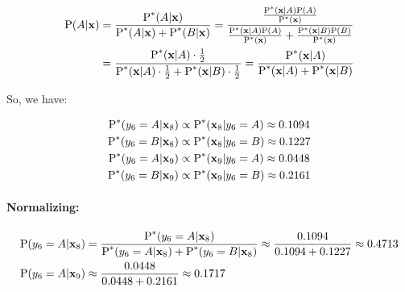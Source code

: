 \documentclass[12pt]{article}
\begin{document}
\begin{enumerate}[leftmargin=\labelsep]
\begin{enumerate}
            \begin{equation}
            \begin{split}
                \textrm{P}(A|\mathbf{x}) &= \frac{\textrm{P}^*(A|\mathbf{x})}{\textrm{P}^*(A|\mathbf{x}) + \textrm{P}^*(B|\mathbf{x})} = \frac{\frac{\textrm{P}^*(\mathbf{x}|A)\textrm{P}(A)}{\textrm{P}^*(\mathbf{x})}}{\frac{\textrm{P}^*(\mathbf{x}|A)\textrm{P}(A)}{\textrm{P}^*(\mathbf{x})} + \frac{\textrm{P}^*(\mathbf{x}|B)\textrm{P}(B)}{\textrm{P}^*(\mathbf{x})}} \\
                &= \frac{\textrm{P}^*(\mathbf{x}|A)\cdot\frac{1}{2}}{\textrm{P}^*(\mathbf{x}|A)\cdot\frac{1}{2} + \textrm{P}^*(\mathbf{x}|B)\cdot\frac{1}{2}} = \frac{\textrm{P}^*(\mathbf{x}|A)}{\textrm{P}^*(\mathbf{x}|A) + \textrm{P}^*(\mathbf{x}|B)}
            \end{split}
            \end{equation}

            So, we have:
            
            \begin{equation}
            \begin{split}
                \textrm{P}^*(y_6 = A | \mathbf{x}_8) &\propto \textrm{P}^*(\mathbf{x}_8 | y_6 = A) \approx 0.1094 \\
                \textrm{P}^*(y_6 = B | \mathbf{x}_8) &\propto \textrm{P}^*(\mathbf{x}_8 | y_6 = B) \approx 0.1227 \\
                \textrm{P}^*(y_6 = A | \mathbf{x}_9) &\propto \textrm{P}^*(\mathbf{x}_9 | y_6 = A) \approx 0.0448 \\
                \textrm{P}^*(y_6 = B | \mathbf{x}_9) &\propto \textrm{P}^*(\mathbf{x}_9 | y_6 = B) \approx 0.2161
            \end{split}
            \end{equation}

            \paragraph{Normalizing:}

            \begin{equation}
            \begin{split}
                \textrm{P}(y_6 = A | \mathbf{x}_8) &= \frac{\textrm{P}^*(y_6 = A | \mathbf{x}_8)}{\textrm{P}^*(y_6 = A | \mathbf{x}_8) + \textrm{P}^*(y_6 = B | \mathbf{x}_8)} \approx \frac{0.1094}{0.1094 + 0.1227} \approx 0.4713 \\
                \textrm{P}(y_6 = A | \mathbf{x}_9) &\approx \frac{0.0448}{0.0448 + 0.2161} \approx 0.1717
            \end{split}
            \end{equation}


\end{enumerate}
\end{enumerate}
\end{document}
